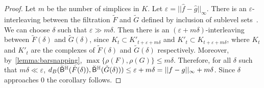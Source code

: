 \documentclass[10pt,a4paper]{amsart}
\newcommand {\mm}[1] {\ifmmode{#1}\else{\mbox{\(#1\)}}\fi}
\newcommand{\har}           {\mm{\mathbb{H}}}
\newcommand{\eps}        {\varepsilon}
\theoremstyle{definition}
\newcommand{\Bei}[1]{{\color{cyan}[#1]}}
\newcommand{\obarc}{\breve{\mathsf{B}}^\har}
\theoremstyle{remark}
\begin{document}
\begin{proof}

    
    Let $m$ be the number of simplices in $K$. Let $\eps = ||\hat{f}-\hat{g}||_\infty$. There is an $\eps$-interleaving between the filtration $\tilde{F}$ and $\tilde{G}$ defined by inclusion of sublevel sets~\cite{Cohen-SteinerEdelsbrunnerHarer2005,ChazalCohenSteinerGlisse2009}. We can choose $\delta$ such that $\eps \gg m\delta$.
    Then there is an $(\eps+m\delta)$-interleaving between $\tilde{F}(\delta)$ and $\tilde{G}(\delta)$, since $K_{t} \subset K'_{t+\eps+m\delta}$ and $K'_{t} \subset K_{t+\eps+m\delta}$, where $K_t$ and $K'_t$ are the complexes of $\tilde{F}(\delta)$ and $\tilde{G}(\delta)$ respectively. Moreover, by~\cref{lemma:barsnapping}, $\max\{\rho(F), \rho(G)\} \leq m\delta$. Therefore, for all $\delta$ such that $m\delta \ll \eps$, $d_B ( {\obarc(\tilde{F}(\delta))}, {\obarc(\tilde{G}(\delta))} )  \leq \eps+m\delta = ||f-g||_\infty+m\delta$. Since $\delta$ approaches 0 the corollary follows. 
\end{proof}






\end{document}
